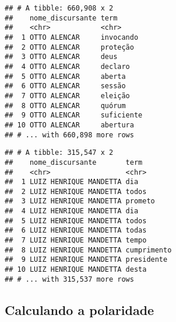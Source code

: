 \documentclass[
]{article}
\newenvironment{Shaded}{\begin{snugshade}}{\end{snugshade}}
\newcommand{\CommentTok}[1]{\textcolor[rgb]{0.56,0.35,0.01}{\textit{#1}}}
\newcommand{\DataTypeTok}[1]{\textcolor[rgb]{0.13,0.29,0.53}{#1}}
\newcommand{\DecValTok}[1]{\textcolor[rgb]{0.00,0.00,0.81}{#1}}
\newcommand{\FloatTok}[1]{\textcolor[rgb]{0.00,0.00,0.81}{#1}}
\newcommand{\KeywordTok}[1]{\textcolor[rgb]{0.13,0.29,0.53}{\textbf{#1}}}
\newcommand{\NormalTok}[1]{#1}
\newcommand{\OperatorTok}[1]{\textcolor[rgb]{0.81,0.36,0.00}{\textbf{#1}}}
\newcommand{\StringTok}[1]{\textcolor[rgb]{0.31,0.60,0.02}{#1}}
\begin{document}
\begin{verbatim}
## # A tibble: 660,908 x 2
##    nome_discursante term      
##    <chr>            <chr>     
##  1 OTTO ALENCAR     invocando 
##  2 OTTO ALENCAR     proteção  
##  3 OTTO ALENCAR     deus      
##  4 OTTO ALENCAR     declaro   
##  5 OTTO ALENCAR     aberta    
##  6 OTTO ALENCAR     sessão    
##  7 OTTO ALENCAR     eleição   
##  8 OTTO ALENCAR     quórum    
##  9 OTTO ALENCAR     suficiente
## 10 OTTO ALENCAR     abertura  
## # ... with 660,898 more rows
\end{verbatim}

\begin{Shaded}
\end{Shaded}

\begin{verbatim}
## # A tibble: 315,547 x 2
##    nome_discursante       term       
##    <chr>                  <chr>      
##  1 LUIZ HENRIQUE MANDETTA dia        
##  2 LUIZ HENRIQUE MANDETTA todos      
##  3 LUIZ HENRIQUE MANDETTA prometo    
##  4 LUIZ HENRIQUE MANDETTA dia        
##  5 LUIZ HENRIQUE MANDETTA todos      
##  6 LUIZ HENRIQUE MANDETTA todas      
##  7 LUIZ HENRIQUE MANDETTA tempo      
##  8 LUIZ HENRIQUE MANDETTA cumprimento
##  9 LUIZ HENRIQUE MANDETTA presidente 
## 10 LUIZ HENRIQUE MANDETTA desta      
## # ... with 315,537 more rows
\end{verbatim}

\hypertarget{calculando-a-polaridade}{%
\subsection{Calculando a polaridade}\label{calculando-a-polaridade}}

\begin{Shaded}
\end{Shaded}
\end{document}
